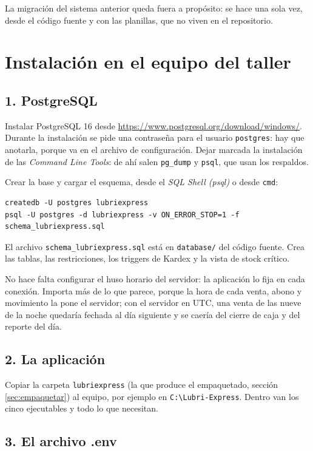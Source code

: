 \documentclass[11pt,a4paper]{article}
\begin{document}
La migración del sistema anterior queda fuera a propósito: se hace una sola vez,
desde el código fuente y con las planillas, que no viven en el repositorio.

\section{Instalación en el equipo del taller}

\subsection{1. PostgreSQL}

Instalar PostgreSQL 16 desde \url{https://www.postgresql.org/download/windows/}.
Durante la instalación se pide una contraseña para el usuario
\texttt{postgres}: hay que anotarla, porque va en el archivo de configuración.
Dejar marcada la instalación de las \emph{Command Line Tools}: de ahí salen
\texttt{pg\_dump} y \texttt{psql}, que usan los respaldos.

Crear la base y cargar el esquema, desde el \emph{SQL Shell (psql)} o desde
\texttt{cmd}:

\begin{lstlisting}
createdb -U postgres lubriexpress
psql -U postgres -d lubriexpress -v ON_ERROR_STOP=1 -f schema_lubriexpress.sql
\end{lstlisting}

El archivo \texttt{schema\_lubriexpress.sql} está en \texttt{database/} del
código fuente. Crea las tablas, las restricciones, los triggers de Kardex y la
vista de stock crítico.

No hace falta configurar el huso horario del servidor: la aplicación lo fija en
cada conexión. Importa más de lo que parece, porque la hora de cada venta, abono
y movimiento la pone el servidor; con el servidor en UTC, una venta de las nueve
de la noche quedaría fechada al día siguiente y se caería del cierre de caja y
del reporte del día.

\subsection{2. La aplicación}

Copiar la carpeta \texttt{lubriexpress} (la que produce el empaquetado, sección
\ref{sec:empaquetar}) al equipo, por ejemplo en
\texttt{C:\textbackslash Lubri-Express}. Dentro van los cinco ejecutables y
todo lo que necesitan.

\subsection{3. El archivo .env}
\end{document}
